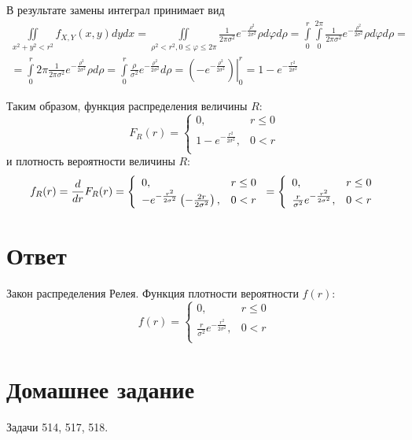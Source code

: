 В результате замены интеграл принимает вид
\begin{multline}
    \iint \limits_{x^2 + y^2 < r^2} f_{X,Y}(x, y) dy dx
    = \iint \limits_{\rho^2 < r^2, 0 \le \varphi \le 2 \pi} \frac{1}{2 \pi \sigma^2} e^{- \frac{\rho^2}{2 \sigma^2}} \rho d \varphi d \rho
    = \int \limits_0^{r} \int \limits_0^{2 \pi} \frac{1}{2 \pi \sigma^2} e^{- \frac{\rho^2}{2 \sigma^2}} \rho d \varphi d \rho = \\
    = \int \limits_0^{r} 2 \pi \frac{1}{2 \pi \sigma^2} e^{- \frac{\rho^2}{2 \sigma^2}} \rho d \rho
    = \int \limits_0^{r} \frac{\rho}{\sigma^2} e^{- \frac{\rho^2}{2 \sigma^2}} d \rho
    = \left . \left ( - e^{- \frac{\rho^2}{2 \sigma^2}} \right ) \right |_0^{r}
    = 1 - e^{-\frac{r^2}{2 \sigma^2}}
\end{multline}

Таким образом, функция распределения величины $R$:
\begin{equation}
    F_R(r)
    = \left \{
    \begin{array}{ll}
        0,                               & r \le 0 \\
        1 - e^{-\frac{r^2}{2 \sigma^2}}, & 0 < r   \\
    \end{array}
    \right .
\end{equation}
и плотность вероятности величины $R$:
\begin{equation}
    f_R(r)
    = \frac{d}{dr} F_R(r)
    = \left \{
    \begin{array}{ll}
        0,                                                                       & r \le 0 \\
        - e^{-\frac{r^2}{2 \sigma^2}} \left ( - \frac{2 r}{2 \sigma^2} \right ), & 0 < r   \\
    \end{array}
    \right .
    = \left \{
    \begin{array}{ll}
        0,                                              & r \le 0 \\
        \frac{r}{\sigma^2} e^{-\frac{r^2}{2 \sigma^2}}, & 0 < r   \\
    \end{array}
    \right .
\end{equation}
\section*{Ответ}
Закон распределения Релея. Функция плотности вероятности $f(r)$:
$$
f(r)
= \left \{
\begin{array}{ll}
    0,                                              & r \le 0 \\
    \frac{r}{\sigma^2} e^{-\frac{r^2}{2 \sigma^2}}, & 0 < r   \\
\end{array}
\right .
$$


\section{Домашнее задание}

Задачи 514, 517, 518.

